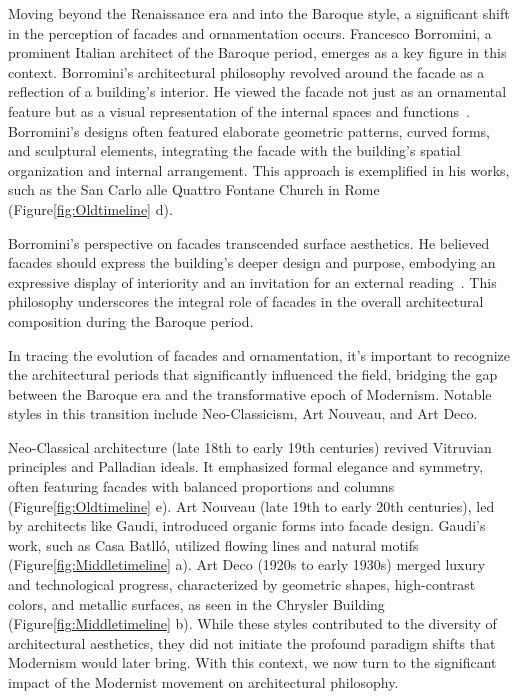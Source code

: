 Moving beyond the Renaissance era and into the Baroque style, a significant shift in the perception of facades and ornamentation occurs.
Francesco Borromini, a prominent Italian architect of the Baroque period, emerges as a key figure in this context.
Borromini's architectural philosophy revolved around the facade as a reflection of a building's interior.
He viewed the facade not just as an ornamental feature but as a visual representation of the internal spaces and functions~\cite{Benjamin2006}.
Borromini's designs often featured elaborate geometric patterns, curved forms, and sculptural elements, integrating the facade with the building's spatial organization and internal arrangement.
This approach is exemplified in his works, such as the San Carlo alle Quattro Fontane Church in Rome (Figure\ref{fig:Oldtimeline} d).

Borromini's perspective on facades transcended surface aesthetics.
He believed facades should express the building's deeper design and purpose, embodying an expressive display of interiority and an invitation for an external reading~\cite{Biglieri2004}.
This philosophy underscores the integral role of facades in the overall architectural composition during the Baroque period.


In tracing the evolution of facades and ornamentation, it's important to recognize the architectural periods that significantly influenced the field, bridging the gap between the Baroque era and the transformative epoch of Modernism.
Notable styles in this transition include Neo-Classicism, Art Nouveau, and Art Deco.

Neo-Classical architecture (late 18th to early 19th centuries) revived Vitruvian principles and Palladian ideals.
It emphasized formal elegance and symmetry, often featuring facades with balanced proportions and columns (Figure\ref{fig:Oldtimeline} e).
Art Nouveau (late 19th to early 20th centuries), led by architects like Gaudi, introduced organic forms into facade design.
Gaudi's work, such as Casa Batlló, utilized flowing lines and natural motifs~\cite{Nasir2022} (Figure\ref{fig:Middletimeline} a).
Art Deco (1920s to early 1930s) merged luxury and technological progress, characterized by geometric shapes, high-contrast colors, and metallic surfaces, as seen in the Chrysler Building~\cite{Kotb2014} (Figure\ref{fig:Middletimeline} b).
While these styles contributed to the diversity of architectural aesthetics, they did not initiate the profound paradigm shifts that Modernism would later bring.
With this context, we now turn to the significant impact of the Modernist movement on architectural philosophy.

